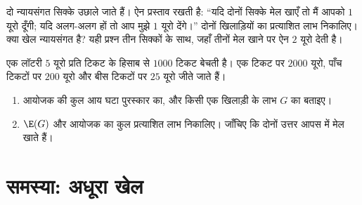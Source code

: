 \begin{exercise}[$\star\star$]\label{exo:g11:prob:10}
दो न्यायसंगत सिक्के उछाले जाते हैं। ऐन प्रस्ताव रखती है: ``यदि दोनों सिक्के
मेल खाएँ तो मैं आपको $1$ यूरो दूँगी; यदि अलग-अलग हों तो आप मुझे $1$ यूरो
देंगे।'' दोनों खिलाड़ियों का प्रत्याशित लाभ निकालिए। क्या खेल न्यायसंगत है?
यही प्रश्न तीन सिक्कों के साथ, जहाँ तीनों मेल खाने पर ऐन $2$ यूरो देती है।
\end{exercise}

\begin{exercise}[$\star\star\star$]\label{exo:g11:prob:11}
एक लॉटरी $5$ यूरो प्रति टिकट के हिसाब से $1000$ टिकट बेचती है। एक टिकट पर
$2000$ यूरो, पाँच टिकटों पर $200$ यूरो और बीस टिकटों पर $25$ यूरो जीते जाते
हैं।
\begin{enumerate}
  \item आयोजक की कुल आय घटा पुरस्कार का, और किसी एक खिलाड़ी के लाभ $G$ का
         बताइए।
  \item $\E(G)$ और आयोजक का कुल प्रत्याशित लाभ निकालिए। जाँचिए कि दोनों उत्तर
        आपस में मेल खाते हैं।
\end{enumerate}
\end{exercise}

\section{समस्या: अधूरा खेल}

